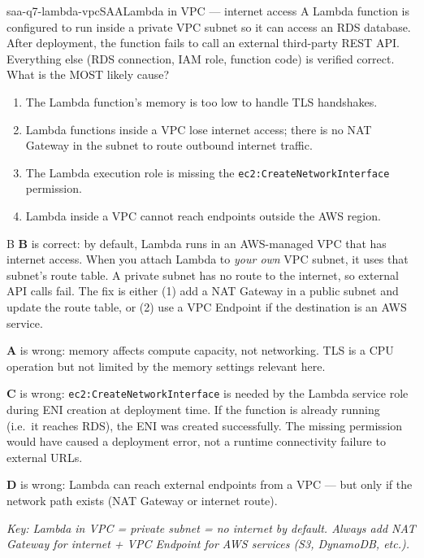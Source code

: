 
\begin{question}{saa-q7-lambda-vpc}{SAA}{Lambda in VPC --- internet access}
A Lambda function is configured to run inside a private VPC subnet so it can access an RDS database. After deployment, the function fails to call an external third-party REST API. Everything else (RDS connection, IAM role, function code) is verified correct. What is the MOST likely cause?

\begin{enumerate}[label=\Alph*.]
  \item The Lambda function's memory is too low to handle TLS handshakes.
  \item Lambda functions inside a VPC lose internet access; there is no NAT Gateway in the subnet to route outbound internet traffic.
  \item The Lambda execution role is missing the \texttt{ec2:CreateNetworkInterface} permission.
  \item Lambda inside a VPC cannot reach endpoints outside the AWS region.
\end{enumerate}
\end{question}

\begin{answer}{B}
\textbf{B} is correct: by default, Lambda runs in an AWS-managed VPC that has internet access. When you attach Lambda to \emph{your own} VPC subnet, it uses that subnet's route table. A private subnet has no route to the internet, so external API calls fail. The fix is either (1) add a NAT Gateway in a public subnet and update the route table, or (2) use a VPC Endpoint if the destination is an AWS service.

\textbf{A} is wrong: memory affects compute capacity, not networking. TLS is a CPU operation but not limited by the memory settings relevant here.

\textbf{C} is wrong: \texttt{ec2:CreateNetworkInterface} is needed by the Lambda service role during ENI creation at deployment time. If the function is already running (i.e.\ it reaches RDS), the ENI was created successfully. The missing permission would have caused a deployment error, not a runtime connectivity failure to external URLs.

\textbf{D} is wrong: Lambda can reach external endpoints from a VPC --- but only if the network path exists (NAT Gateway or internet route).

\textit{Key: Lambda in VPC = private subnet = no internet by default. Always add NAT Gateway for internet + VPC Endpoint for AWS services (S3, DynamoDB, etc.).}
\end{answer}

